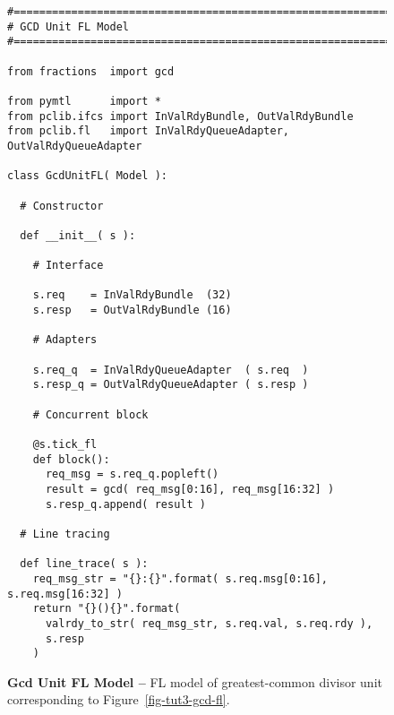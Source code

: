 
\begin{figure}

  \begin{lstlisting}[xleftmargin={0.9in}]
#=========================================================================
# GCD Unit FL Model
#=========================================================================

from fractions  import gcd

from pymtl      import *
from pclib.ifcs import InValRdyBundle, OutValRdyBundle
from pclib.fl   import InValRdyQueueAdapter, OutValRdyQueueAdapter

class GcdUnitFL( Model ):

  # Constructor

  def __init__( s ):

    # Interface

    s.req    = InValRdyBundle  (32)
    s.resp   = OutValRdyBundle (16)

    # Adapters

    s.req_q  = InValRdyQueueAdapter  ( s.req  )
    s.resp_q = OutValRdyQueueAdapter ( s.resp )

    # Concurrent block

    @s.tick_fl
    def block():
      req_msg = s.req_q.popleft()
      result = gcd( req_msg[0:16], req_msg[16:32] )
      s.resp_q.append( result )

  # Line tracing

  def line_trace( s ):
    req_msg_str = "{}:{}".format( s.req.msg[0:16], s.req.msg[16:32] )
    return "{}(){}".format(
      valrdy_to_str( req_msg_str, s.req.val, s.req.rdy ),
      s.resp
    )
\end{lstlisting}

  \caption{\textbf{Gcd Unit FL Model --} FL model of greatest-common
    divisor unit corresponding to Figure~\ref{fig-tut3-gcd-fl}.}
  \label{code-tut3-gcd-fl}

\end{figure}


